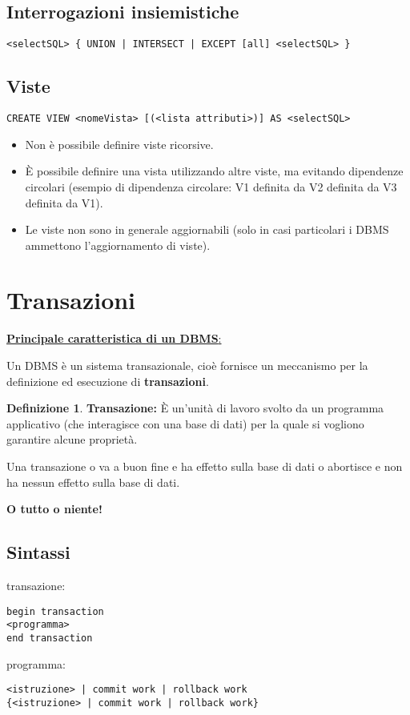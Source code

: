 \documentclass[a4paper, 10pt]{article}
\theoremstyle{definition}
\newtheorem*{defn}{Definizione}
\begin{document}
		\subsection*{Interrogazioni insiemistiche}
		\begin{lstlisting}
<selectSQL> { UNION | INTERSECT | EXCEPT [all] <selectSQL> }
		\end{lstlisting}
		
		\subsection*{Viste}
		\begin{lstlisting}
CREATE VIEW <nomeVista> [(<lista attributi>)] AS <selectSQL>
		\end{lstlisting}
		\begin{itemize}
			\item Non è possibile definire viste ricorsive.
			\item È possibile definire una vista utilizzando altre viste,
			ma evitando dipendenze circolari (esempio di
			dipendenza circolare: V1 definita da V2 definita da
			V3 definita da V1).
			\item Le viste non sono in generale aggiornabili (solo in
			casi particolari i DBMS ammettono l'aggiornamento
			di viste).
		\end{itemize}
		
		\newpage
		
	\section{Transazioni}
	\underline{\textbf{Principale caratteristica di un DBMS}:} 
	
	\bigskip
	
	Un DBMS è un sistema transazionale, cioè fornisce un
	meccanismo per la definizione ed esecuzione di \textbf{transazioni}.
	
	\begin{defn}
		\textbf{Transazione:}
		È un'unità di lavoro svolto da un programma applicativo (che
		interagisce con una base di dati) per la quale si vogliono garantire
		alcune proprietà.
		
		Una transazione o va a buon fine e ha effetto sulla base di dati o
		abortisce e non ha nessun effetto sulla base di dati.
	\end{defn}
	
	\textbf{O tutto o niente!}
	
	\subsection{Sintassi}
	transazione:
		\begin{lstlisting}
begin transaction
<programma>
end transaction
		\end{lstlisting}
	programma:
		\begin{lstlisting}
<istruzione> | commit work | rollback work
{<istruzione> | commit work | rollback work}
		\end{lstlisting}
	
\end{document}
